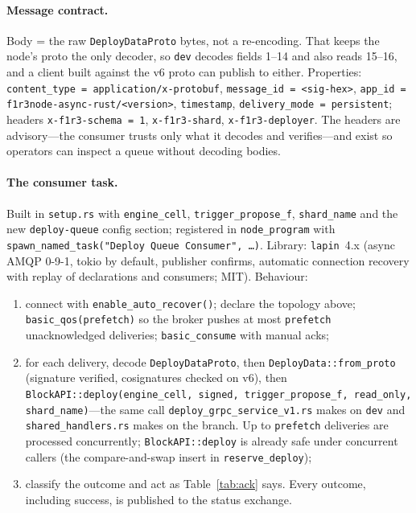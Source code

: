 \documentclass[11pt]{article}
\newcommand{\code}[1]{\texttt{#1}}
\newcommand{\dev}{\code{dev}}
\newcommand{\ote}{\path{feature/rev-stacks-ote}}
\begin{document}
\paragraph{Message contract.} Body = the raw \code{DeployDataProto} bytes, not a
re-encoding. That keeps the node's proto the only decoder, so \dev{} decodes fields
1--14 and \ote{} also reads 15--16, and a client built against the v6 proto can
publish to either. Properties: \code{content\_type = application/x-protobuf},
\code{message\_id = <sig-hex>}, \code{app\_id = f1r3node-async-rust/<version>},
\code{timestamp}, \code{delivery\_mode = persistent}; headers
\code{x-f1r3-schema = 1}, \code{x-f1r3-shard}, \code{x-f1r3-deployer}. The headers
are advisory---the consumer trusts only what it decodes and verifies---and exist so
operators can inspect a queue without decoding bodies.

\paragraph{The consumer task.} Built in \code{setup.rs} with \code{engine\_cell},
\code{trigger\_propose\_f}, \code{shard\_name} and the new \code{deploy-queue} config
section; registered in \code{node\_program} with
\code{spawn\_named\_task("Deploy Queue Consumer", \ldots)}. Library: \code{lapin}~4.x
(async AMQP 0-9-1, tokio by default, publisher confirms, automatic connection recovery
with replay of declarations and consumers; MIT). Behaviour:
\begin{enumerate}[leftmargin=2em]
  \item connect with \code{enable\_auto\_recover()}; declare the topology above;
    \code{basic\_qos(prefetch)} so the broker pushes at most \code{prefetch}
    unacknowledged deliveries; \code{basic\_consume} with manual acks;
  \item for each delivery, decode \code{DeployDataProto}, then
    \code{DeployData::from\_proto} (signature verified, cosignatures checked on v6),
    then \code{BlockAPI::deploy(engine\_cell, signed, trigger\_propose\_f,
    read\_only, shard\_name)}---the same call \code{deploy\_grpc\_service\_v1.rs}
    makes on \dev{} and \code{shared\_handlers.rs} makes on the branch. Up to
    \code{prefetch} deliveries are processed concurrently; \code{BlockAPI::deploy}
    is already safe under concurrent callers (the compare-and-swap insert in
    \code{reserve\_deploy});
  \item classify the outcome and act as Table~\ref{tab:ack} says. Every outcome,
    including success, is published to the status exchange.
\end{enumerate}
\end{document}
